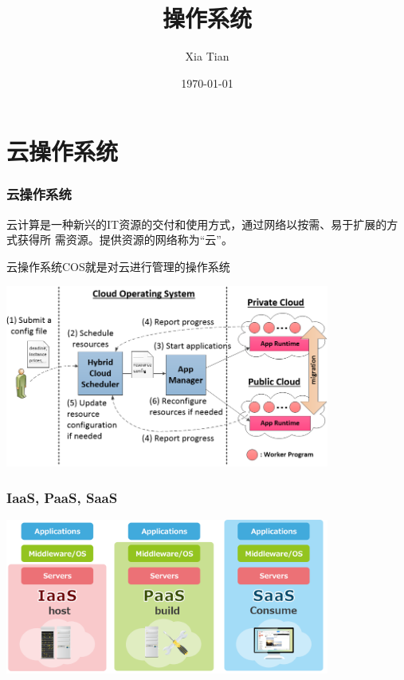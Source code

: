 \documentclass[table, t,13pt]{beamer}
\begin{document}
  \title{操作系统}
  \author{Xia Tian }
  \date{\today{}}

  \frame{\titlepage}

%
%
%
% 
%


\section{云操作系统}
\begin{frame}[fragile]
  \frametitle{云操作系统}
  云计算是一种新兴的IT资源的交付和使用方式，通过网络以按需、易于扩展的方式获得所
  需资源。提供资源的网络称为“云”。

  云操作系统COS就是对云进行管理的操作系统

  \includegraphics[width=0.8\textwidth]{figure/cos/arch.png}
\end{frame}


\begin{frame}[fragile]
  \frametitle{IaaS, PaaS, SaaS}
  \includegraphics[width=0.8\textwidth]{figure/cos/iaas.png}
\end{frame}
\end{document}
